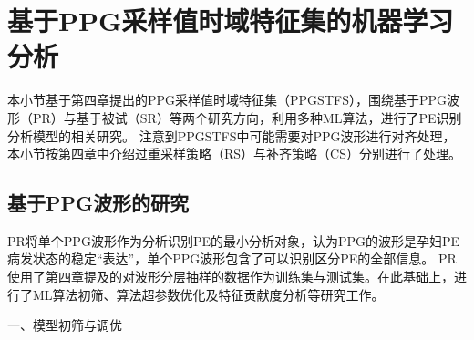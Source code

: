\section{基于PPG采样值时域特征集的机器学习分析}
本小节基于第四章提出的PPG采样值时域特征集（PPGSTFS），围绕基于PPG波形（PR）与基于被试（SR）等两个研究方向，利用多种ML算法，进行了PE识别分析模型的相关研究。
注意到PPGSTFS中可能需要对PPG波形进行对齐处理，本小节按第四章中介绍过重采样策略（RS）与补齐策略（CS）分别进行了处理。

\subsection{基于PPG波形的研究}
PR将单个PPG波形作为分析识别PE的最小分析对象，认为PPG的波形是孕妇PE病发状态的稳定“表达”，单个PPG波形包含了可以识别区分PE的全部信息。
PR使用了第四章提及的对波形分层抽样的数据作为训练集与测试集。在此基础上，进行了ML算法初筛、算法超参数优化及特征贡献度分析等研究工作。

一、模型初筛与调优

